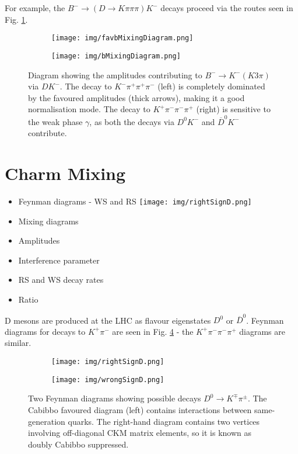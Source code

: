 \documentclass[note.tex]{subfiles}
\begin{document}
For example, the $B^- \rightarrow (D \rightarrow K \pi \pi \pi) K^-$ decays proceed via the routes seen in Fig. \ref{b mixing}.

\begin{figure}[htb!]
    \begin{subfigure}[htb!]{0.5\linewidth}
        \texttt{[image: img/favbMixingDiagram.png]}
    \end{subfigure}
    \begin{subfigure}[htb!]{0.5\linewidth}
        \texttt{[image: img/bMixingDiagram.png]}
    \end{subfigure}
    \caption{Diagram showing the amplitudes contributing to $B^-\rightarrow K^-(K3\pi)$ via $DK^-$.
        The decay to $K^-\pi^+\pi^+\pi^-$ (left) is completely dominated by the favoured amplitudes (thick arrows), making it a good normalisation mode.
        The decay to $K^+\pi^-\pi^-\pi^+$ (right) is sensitive to the weak phase $\gamma$, as both the decays via $D^0K^-$ and $\overline{D}^
            0K^-$ contribute.
    }
    \label{b mixing}
\end{figure}



\section{Charm Mixing}
\begin{itemize}
    \item Feynman diagrams - WS and RS
          \texttt{[image: img/rightSignD.png]}
    \item Mixing diagrams
    \item Amplitudes
    \item Interference parameter
    \item RS and WS decay rates
    \item Ratio
\end{itemize}
D mesons are produced at the LHC as flavour eigenstates $D^0$ or $\overline{D}^0$.
Feynman diagrams for decays to $K^+ \pi^-$ are seen in Fig. \ref{d Feynman} - the $K^+ \pi^- \pi^- \pi^+$ diagrams are similar.

\begin{figure}[htb!]
    \begin{subfigure}[t]{0.5\linewidth}
        \centering
        \texttt{[image: img/rightSignD.png]}
        \caption{}
        \label{CF}
    \end{subfigure}
    \begin{subfigure}[t]{0.5\linewidth}
        \centering
        \texttt{[image: img/wrongSignD.png]}
        \caption{}
        \label{DCS}
    \end{subfigure}
    \caption{Two Feynman diagrams showing possible decays $D^0 \rightarrow K^\mp \pi^\pm$.
        The Cabibbo favoured diagram (left) contains interactions between same-generation quarks.
        The right-hand diagram contains two vertices involving off-diagonal CKM matrix elements, so it is known as doubly Cabibbo suppressed.
    }
    \label{d Feynman}
\end{figure}
\end{document}
